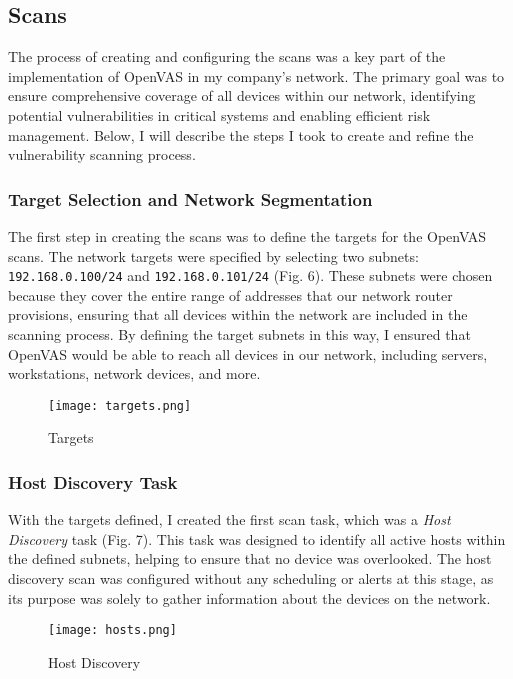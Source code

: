 \documentclass[twocolumn]{article}
\begin{document}
\subsection{Scans}

The process of creating and configuring the scans was a key part of the implementation of OpenVAS in my company's network. The primary goal was to ensure comprehensive coverage of all devices within our network, identifying potential vulnerabilities in critical systems and enabling efficient risk management. Below, I will describe the steps I took to create and refine the vulnerability scanning process.

\subsubsection{Target Selection and Network Segmentation}

The first step in creating the scans was to define the targets for the OpenVAS scans. The network targets were specified by selecting two subnets: \texttt{192.168.0.100/24} and \texttt{192.168.0.101/24} (Fig. 6). These subnets were chosen because they cover the entire range of addresses that our network router provisions, ensuring that all devices within the network are included in the scanning process. By defining the target subnets in this way, I ensured that OpenVAS would be able to reach all devices in our network, including servers, workstations, network devices, and more.

\begin{figure}[h!]
    \centering
    \texttt{[image: targets.png]}
    \caption{Targets}
\end{figure}

\subsubsection{Host Discovery Task}

With the targets defined, I created the first scan task, which was a \textit{Host Discovery} task (Fig. 7). This task was designed to identify all active hosts within the defined subnets, helping to ensure that no device was overlooked. The host discovery scan was configured without any scheduling or alerts at this stage, as its purpose was solely to gather information about the devices on the network.

\begin{figure}[h!]
    \centering
    \texttt{[image: hosts.png]}
    \caption{Host Discovery}
\end{figure}
\end{document}
